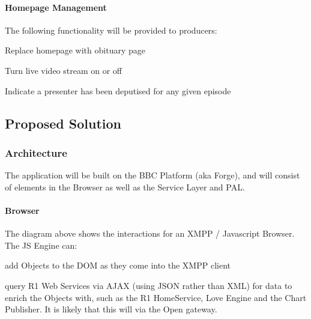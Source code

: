 \documentclass[a4paper, 11pt]{scrreprt}
\begin{document}
\paragraph{Homepage Management}
The following functionality will be provided to producers:



\begin{tystrul}


\item Replace homepage with obituary page

\item Turn live video stream on or off

\item Indicate a presenter has been deputised for any given episode

\end{tystrul}


\subsection{Proposed Solution}
\label{h.4iv9vixt6t4x}

\subsubsection{Architecture}
\label{h.hoq2qgo5lxdl}
The application will be built on the BBC Platform (aka Forge), and will consist of elements in the Browser as well as the Service Layer and PAL.


\paragraph{Browser}
\label{h.hyot1o6ssi8z}
The diagram above shows the interactions for an XMPP / Javascript Browser. The JS Engine can:



\begin{tystrul}


\item add Objects to the DOM as they come into the XMPP client

\item query R1 Web Services via AJAX (using JSON rather than XML) for data to enrich the Objects with, such as the R1 HomeService, Love Engine and the Chart Publisher. It is likely that this will via the Open gateway.

\end{tystrul}
\end{document}
